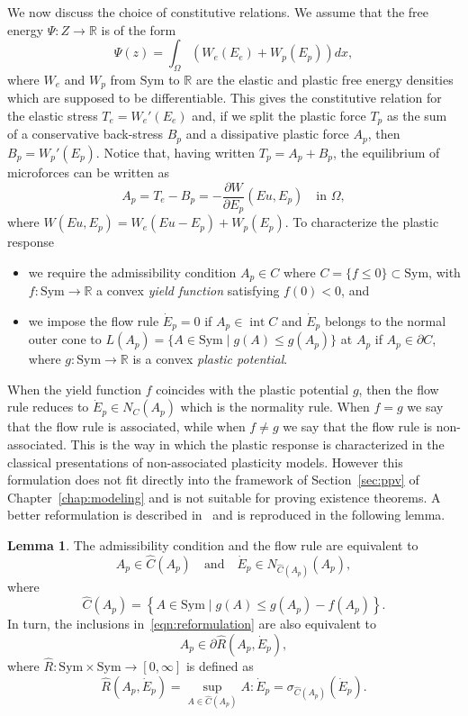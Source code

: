 \documentclass[a4paper,10pt,twoside]{amsbook}
\numberwithin{section}{chapter}
\numberwithin{equation}{chapter}
\theoremstyle{definition}
\newtheorem{lemma}[prop]{Lemma}
\DeclareMathOperator{\inter}{int}
\newcommand{\dind}[2]{\frac{\partial #1}{\partial #2}}
\begin{document}
We now discuss the choice of constitutive relations. We assume that the free energy $\Psi\colon Z\to\mathbb{R}$ is of the form
\[
\Psi(z)=\int_\Omega\left(W_e(E_e)+W_p(E_p)\right)dx,
\]
where $W_e$ and $W_p$ from $\text{Sym}$ to $\mathbb{R}$ are the elastic and plastic free energy densities which are supposed to be differentiable. This gives the constitutive relation for the elastic stress $T_e=W_e'(E_e)$ and, if we split the plastic force $T_p$ as the sum of a conservative back-stress $B_p$ and a dissipative plastic force $A_p$, then $B_p=W_p'(E_p)$. Notice that, having written $T_p=A_p+B_p$, the equilibrium of microforces can be written as
\begin{equation}
\label{eqn:Ap}
A_p=T_e-B_p=-\dind{W}{E_p}(Eu,E_p)\quad\text{in $\Omega$},
\end{equation}
where $W(Eu,E_p)=W_e(Eu-E_p)+W_p(E_p)$. To characterize the plastic response
\begin{itemize}
\item[(i)] we require the admissibility condition $A_p\in C$ where $C=\{f\le0\}\subset\text{Sym}$, with $f\colon\text{Sym}\to\mathbb{R}$ a convex \emph{yield function} satisfying $f(0)<0$, and
\item[(ii)] we impose the flow rule $\dot E_p=0$ if $A_p\in\inter C$ and $\dot E_p$ belongs to the normal outer cone to $L(A_p)=\{A\in\text{Sym}\;|\;g(A)\le g(A_p)\}$ at $A_p$ if $A_p\in\partial C$, where $g\colon\text{Sym}\to\mathbb{R}$ is a convex \emph{plastic potential}.
\end{itemize}
When the yield function $f$ coincides with the plastic potential $g$, then the flow rule reduces to $\dot E_p\in N_C(A_p)$ which is the normality rule. When $f=g$ we say that the flow rule is associated, while when $f\neq g$ we say that the flow rule is non-associated. This is the way in which the plastic response is characterized in the classical presentations of non-associated plasticity models. However this formulation does not fit directly into the framework of Section~\ref{sec:ppv} of Chapter~\ref{chap:modeling} and is not suitable for proving existence theorems. A better reformulation is described in~\cite{Laborde1987,morafrancfort,StefanelliVikelis2024} and is reproduced in the following lemma.
\begin{lemma}
The admissibility condition and the flow rule are equivalent to
\begin{equation}
\label{eqn:reformulation}
A_p\in\hat{C}(A_p)\quad\text{and}\quad\dot E_p\in N_{\hat{C}(A_p)}(A_p),
\end{equation}
where
\[
\hat{C}(A_p)=\left\{A\in\text{Sym}\;|\;g(A)\le g(A_p)-f(A_p)\right\}.
\]
In turn, the inclusions in~\eqref{eqn:reformulation} are also equivalent to
\begin{equation}
\label{eqn:reformulation-2}
A_p\in\partial\hat{R}(A_p,\dot E_p),
\end{equation}
where $\hat{R}\colon\text{Sym}\times\text{Sym}\to[0,\infty]$ is defined as
\begin{equation}
\label{eqn:R-hat}
\hat{R}(A_p,\dot E_p)=\sup_{A\in\hat{C}(A_p)}A:\dot E_p=\sigma_{\hat{C}(A_p)}(\dot E_p).
\end{equation}
\end{lemma}
\end{document}
